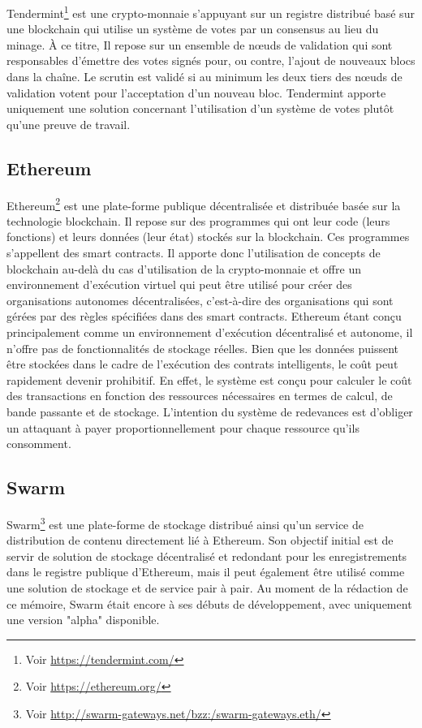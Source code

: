 \documentclass{tnreport}
\begin{document}
Tendermint\footnote{Voir \url{https://tendermint.com/}} est une crypto-monnaie s'appuyant sur un registre distribué basé sur une blockchain qui utilise un système de votes par un consensus au lieu du minage. À ce titre, Il repose sur un ensemble de nœuds de validation qui sont responsables d'émettre des votes signés pour, ou contre, l'ajout de nouveaux blocs dans la chaîne. Le scrutin est validé si au minimum les deux tiers des nœuds de validation votent pour l'acceptation d'un nouveau bloc. Tendermint apporte uniquement une solution concernant l'utilisation d'un système de votes plutôt qu'une preuve de travail.

\subsection{Ethereum}
\label{sec:ethereum}
Ethereum\footnote{Voir \url{https://ethereum.org/}} est une plate-forme publique décentralisée et distribuée basée sur la technologie blockchain. Il repose sur des programmes qui ont leur code (leurs fonctions) et leurs données (leur état) stockés sur la blockchain. Ces programmes s'appellent des smart contracts. 
Il apporte donc l'utilisation de concepts de blockchain au-delà du cas d'utilisation de la crypto-monnaie et offre un environnement d'exécution virtuel qui peut être utilisé pour créer des organisations autonomes décentralisées, c'est-à-dire des organisations qui sont gérées par des règles spécifiées dans des smart contracts. Ethereum étant conçu principalement comme un environnement d'exécution décentralisé et autonome, il n'offre pas de fonctionnalités de stockage réelles. Bien que les données puissent être stockées dans le cadre de l'exécution des contrats intelligents, le coût peut rapidement devenir prohibitif. En effet, le système est conçu pour calculer le coût des transactions en fonction des ressources nécessaires en termes de calcul, de bande passante et de stockage. L'intention du système de redevances est d'obliger un attaquant à payer proportionnellement pour chaque ressource qu'ils consomment.

\subsection{Swarm}

Swarm\footnote{Voir \url{http://swarm-gateways.net/bzz:/swarm-gateways.eth/}} est une plate-forme de stockage distribué ainsi qu'un service de distribution de contenu directement lié à Ethereum. Son objectif initial est de servir de solution de stockage décentralisé et redondant pour les enregistrements dans le registre publique d'Ethereum, mais il peut également être utilisé comme une solution de stockage et de service pair à pair. Au moment de la rédaction de ce mémoire, Swarm était encore à ses débuts de développement, avec uniquement une version "alpha" disponible.
\end{document}
